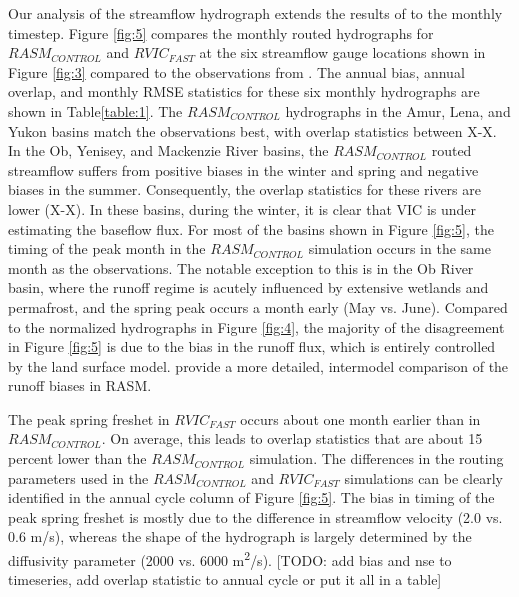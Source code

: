 \documentclass[jgrga, draft]{agutex}
\begin{document}
\begin{article}
Our analysis of the streamflow hydrograph extends the results of \citet{Hamman_2016} to the monthly timestep.
Figure \ref{fig:5} compares the monthly routed hydrographs for $RASM_{CONTROL}$ and $RVIC_{FAST}$ at the six streamflow gauge locations shown in Figure \ref{fig:3} compared to the observations from \citep{Dai_2009}.
The annual bias, annual overlap, and monthly RMSE statistics for these six monthly hydrographs are shown in Table\ref{table:1}.
The $RASM_{CONTROL}$ hydrographs in the Amur, Lena, and Yukon basins match the observations best, with overlap statistics between X-X.
In the Ob, Yenisey, and Mackenzie River basins, the $RASM_{CONTROL}$ routed streamflow suffers from positive biases in the winter and spring and negative biases in the summer.
Consequently, the overlap statistics for these rivers are lower (X-X).
In these basins, during the winter, it is clear that VIC is under estimating the baseflow flux.
For most of the basins shown in Figure \ref{fig:5}, the timing of the peak month in the $RASM_{CONTROL}$ simulation occurs in the same month as the observations.
The notable exception to this is in the Ob River basin, where the runoff regime is acutely influenced by extensive wetlands and permafrost, and the spring peak occurs a month early (May vs. June).
Compared to the normalized hydrographs in Figure \ref{fig:4}, the majority of the disagreement in Figure \ref{fig:5} is due to the bias in the runoff flux, which is entirely controlled by the land surface model.
\citet{Hamman_2016} provide a more detailed, intermodel comparison of the runoff biases in RASM.

The peak spring freshet in $RVIC_{FAST}$ occurs about one month earlier than in $RASM_{CONTROL}$.
On average, this leads to overlap statistics that are about 15 percent lower than the $RASM_{CONTROL}$ simulation.
The differences in the routing parameters used in the $RASM_{CONTROL}$ and $RVIC_{FAST}$ simulations can be clearly identified in the annual cycle column of Figure \ref{fig:5}.
The bias in timing of the peak spring freshet is mostly due to the difference in streamflow velocity (2.0 vs. 0.6 m/s), whereas the shape of the hydrograph is largely determined by the diffusivity parameter (2000 vs. 6000 m\textsuperscript{2}/s).
[TODO: add bias and nse to timeseries, add overlap statistic to annual cycle or put it all in a table]


\end{article}
\end{document}
